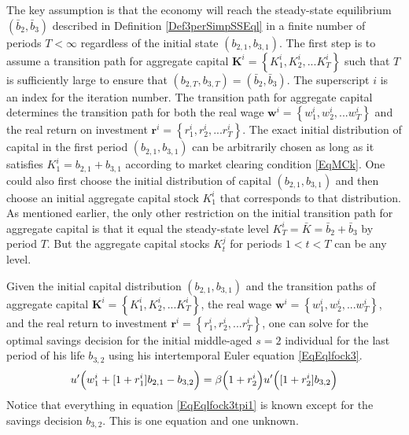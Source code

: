 \documentclass[letterpaper,12pt]{article}
\theoremstyle{definition}
\numberwithin{equation}{section}
\numberwithin{exercise}{section}
\begin{document}
\begin{spacing}{1.5}
      The key assumption is that the economy will reach the steady-state equilibrium $(\bar{b}_2,\bar{b}_3)$ described in Definition \ref{Def3perSimpSSEql} in a finite number of periods $T<\infty$ regardless of the initial state $(b_{2,1},b_{3,1})$. The first step is to assume a transition path for aggregate capital $\bm{K}^i = \left\{K_1^i,K_2^i,...K_T^i\right\}$ such that $T$ is sufficiently large to ensure that $(b_{2,T},b_{3,T}) = (\bar{b}_2,\bar{b}_3)$. The superscript $i$ is an index for the iteration number. The transition path for aggregate capital determines the transition path for both the real wage $\bm{w}^i = \left\{w_1^i,w_2^i,...w_T^i\right\}$ and the real return on investment $\bm{r}^i = \left\{r_1^i,r_2^i,...r_T^i\right\}$. The exact initial distribution of capital in the first period $(b_{2,1},b_{3,1})$ can be arbitrarily chosen as long as it satisfies $K_1^i = b_{2,1} + b_{3,1}$ according to market clearing condition \eqref{EqMCk}. One could also first choose the initial distribution of capital $(b_{2,1},b_{3,1})$ and then choose an initial aggregate capital stock $K_1^i$ that corresponds to that distribution. As mentioned earlier, the only other restriction on the initial transition path for aggregate capital is that it equal the steady-state level $K_T^i = \bar{K} = \bar{b}_2 + \bar{b}_3$ by period $T$. But the aggregate capital stocks $K_t^j$ for periods $1<t<T$ can be any level.

      Given the initial capital distribution $(b_{2,1},b_{3,1})$ and the transition paths of aggregate capital $\bm{K}^i = \left\{K_1^i,K_2^i,...K_T^i\right\}$, the real wage $\bm{w}^i = \left\{w_1^i,w_2^i,...w_T^i\right\}$, and the real return to investment $\bm{r}^i = \left\{r_1^i,r_2^i,...r_T^i\right\}$, one can solve for the optimal savings decision for the initial middle-aged $s=2$ individual for the last period of his life $b_{3,2}$ using his intertemporal Euler equation \eqref{EqEqlfock3}.
      \begin{equation}\label{EqEqlfock3tpi1}
         u'\Bigl(w_1^i + [1 + r_1^i]b_{2,1} - b_{3,2}\Bigr) = \beta\Bigl(1 + r_2^i\Bigr)u'\Bigl([1 + r_2^i]b_{3,2}\Bigr)
      \end{equation}
      Notice that everything in equation \eqref{EqEqlfock3tpi1} is known except for the savings decision $b_{3,2}$. This is one equation and one unknown.


\end{spacing}
\end{document}
